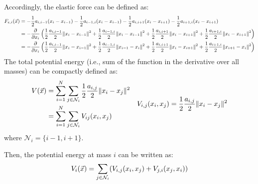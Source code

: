 \begin{description}
        Accordingly, the elastic force can be defined as:
        \[
            \small
            \begin{split}
                F_{e,i}({\vec{x}}) 
                &= 
                    - \frac{1}{2} a_{i,i-1}(x_i - x_{i-1}) 
                    - \frac{1}{2} a_{i-1,i}(x_i - x_{i-1}) 
                    - \frac{1}{2} a_{i,i+1}(x_i - x_{i+1}) 
                    - \frac{1}{2} a_{i+1,i}(x_i - x_{i+1}) \\
                &= -\frac{\partial}{\partial x_i} \left( 
                        \frac{1}{2} \frac{a_{i,i-1}}{2} \Vert x_i - x_{i-1} \Vert^2 + 
                        \frac{1}{2} \frac{a_{i-1,i}}{2} \Vert x_{i} - x_{i-1} \Vert^2 + 
                        \frac{1}{2} \frac{a_{i,i+1}}{2} \Vert x_i - x_{i+1} \Vert^2 + 
                        \frac{1}{2} \frac{a_{i+1,i}}{2} \Vert x_{i} - x_{i+1} \Vert^2 \right) \\
                &= -\frac{\partial}{\partial x_i} \left( 
                    \frac{1}{2} \frac{a_{i,i-1}}{2} \Vert x_i - x_{i-1} \Vert^2 + 
                    \frac{1}{2} \frac{a_{i-1,i}}{2} \Vert x_{i-1} - x_{i} \Vert^2 + 
                    \frac{1}{2} \frac{a_{i,i+1}}{2} \Vert x_i - x_{i+1} \Vert^2 + 
                    \frac{1}{2} \frac{a_{i+1,i}}{2} \Vert x_{i+1} - x_{i} \Vert^2 \right)
            \end{split}
        \]
        The total potential energy (i.e., sum of the function in the derivative over all masses) can be compactly defined as:
        \[
            \begin{split}
                V({\vec{x}}) &= \sum_{i=1}^{N} \sum_{j \in \mathcal{N}_i} \frac{1}{2} \frac{a_{i,j}}{2} \Vert x_i - x_j \Vert^2 \\
                &= \sum_{i=1}^{N} \sum_{j \in \mathcal{N}_i} V_{ij}(x_i, x_j)
            \end{split}
            \quad
            V_{i,j}(x_i, x_j) = \frac{1}{2} \frac{a_{i,j}}{2} \Vert x_i - x_j \Vert^2
        \]
        where $\mathcal{N}_i = \{ i-1, i+1 \}$.

        Then, the potential energy at mass $i$ can be written as:
        \[
            V_i({\vec{x}}) = \sum_{j \in \mathcal{N}_i} ( V_{i,j}(x_i, x_j) + V_{j,i}(x_j, x_i) )
        \]
            

\end{description}
